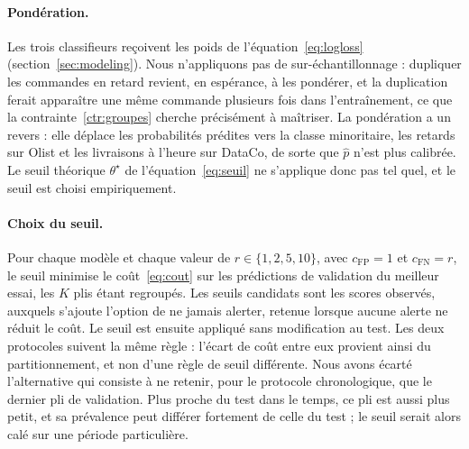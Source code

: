 \documentclass[11pt,a4paper]{article}
\theoremstyle{definition}
\begin{document}
\paragraph{Pondération.} Les trois classifieurs reçoivent les poids de l'équation~\eqref{eq:logloss} (section~\ref{sec:modeling}). Nous n'appliquons pas de sur-échantillonnage : dupliquer les commandes en retard revient, en espérance, à les pondérer, et la duplication ferait apparaître une même commande plusieurs fois dans l'entraînement, ce que la contrainte~\ref{ctr:groupes} cherche précisément à maîtriser. La pondération a un revers : elle déplace les probabilités prédites vers la classe minoritaire, les retards sur Olist et les livraisons à l'heure sur DataCo, de sorte que $\hat{p}$ n'est plus calibrée. Le seuil théorique $\theta^\star$ de l'équation~\eqref{eq:seuil} ne s'applique donc pas tel quel, et le seuil est choisi empiriquement.

\paragraph{Choix du seuil.} Pour chaque modèle et chaque valeur de $r \in \{1, 2, 5, 10\}$, avec $c_{\mathrm{FP}} = 1$ et $c_{\mathrm{FN}} = r$, le seuil minimise le coût~\eqref{eq:cout} sur les prédictions de validation du meilleur essai, les $K$ plis étant regroupés. Les seuils candidats sont les scores observés, auxquels s'ajoute l'option de ne jamais alerter, retenue lorsque aucune alerte ne réduit le coût. Le seuil est ensuite appliqué sans modification au test. Les deux protocoles suivent la même règle : l'écart de coût entre eux provient ainsi du partitionnement, et non d'une règle de seuil différente. Nous avons écarté l'alternative qui consiste à ne retenir, pour le protocole chronologique, que le dernier pli de validation. Plus proche du test dans le temps, ce pli est aussi plus petit, et sa prévalence peut différer fortement de celle du test ; le seuil serait alors calé sur une période particulière.
\end{document}
